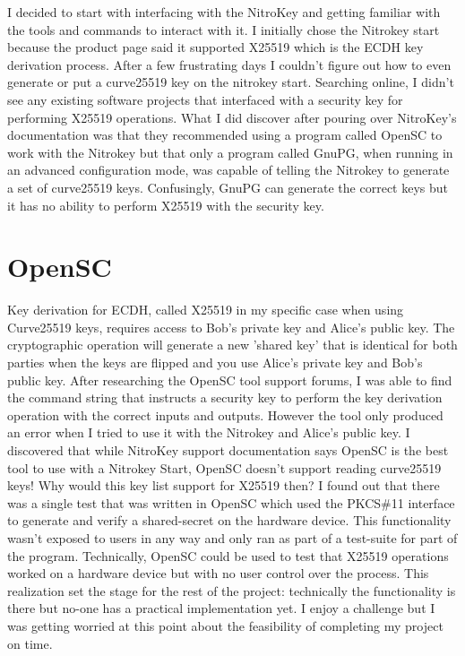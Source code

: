 \documentclass [11pt, proquest] {uwthesis}[2020/02/24]
\begin{document}
I decided to start with interfacing with the NitroKey and getting familiar with the tools and commands to interact with it. I initially chose the Nitrokey start because the product page said it supported X25519\cite{noauthor_nitrokey_nodate} which is the ECDH key derivation process. After a few frustrating days I couldn't figure out how to even generate or put a curve25519 key on the nitrokey start. Searching online, I didn't see any existing software projects that interfaced with a security key for performing X25519 operations. What I did discover after pouring over NitroKey's documentation was that they recommended using a program called OpenSC to work with the Nitrokey but that only a program called GnuPG, when running in an advanced configuration mode, was capable of telling the Nitrokey to generate a set of curve25519 keys. Confusingly, GnuPG can generate the correct keys but it has no ability to perform X25519 with the security key.

\section {OpenSC}
Key derivation for ECDH, called X25519 in my specific case when using Curve25519 keys, requires access to Bob's private key and Alice's public key. The cryptographic operation will generate a new 'shared key' that is identical for both parties when the keys are flipped and you use Alice's private key and Bob's public key. 
After researching the OpenSC tool support forums, I was able to find the command string that instructs a  security key to perform the key derivation operation with the correct inputs and outputs. However the tool only produced an error when I tried to use it with the Nitrokey and Alice's public key. I discovered that while NitroKey support documentation says OpenSC is the best tool to use with a Nitrokey Start, OpenSC doesn't support reading curve25519 keys! Why would this key list support for X25519 then? I found out that there was a single test that was written in OpenSC which used the PKCS\#11 interface to generate and verify a shared-secret on the hardware device. This functionality wasn't exposed to users in any way and only ran as part of a test-suite for part of the program. Technically, OpenSC could be used to test that X25519 operations worked on a hardware device but with no user control over the process. This realization set the stage for the rest of the project: technically the functionality is there but no-one has a practical implementation yet. I enjoy a challenge but I was getting worried at this point about the feasibility of completing my project on time.
\end{document}

